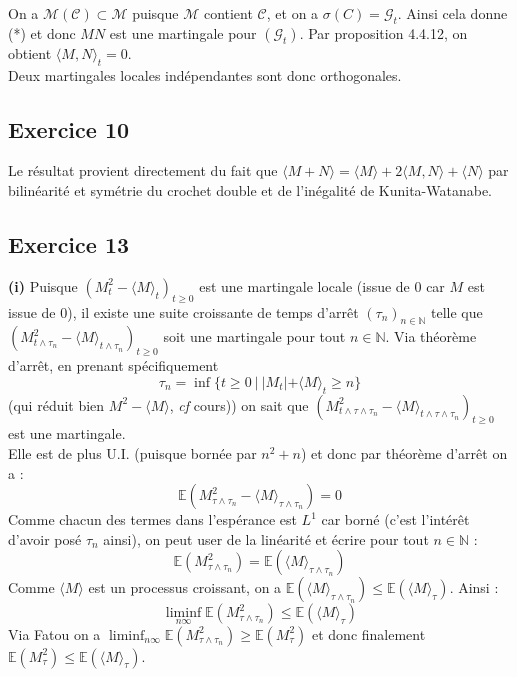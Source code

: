 \documentclass[a4paper,12pt]{article}
\newcommand{\E}{\mathbb{E}}
\newcommand{\n}{\mathbb{N}}
\begin{document}
On a $\mathcal{M} (\mathcal{C}) \subset \mathcal{M}$ puisque $\mathcal{M}$ contient $\mathcal{C}$, et on a $\sigma (C) = \mathcal{G}_t$. Ainsi cela donne (*) et donc $MN$ est une martingale  pour $(\mathcal{G}_t)$. Par proposition 4.4.12, on obtient $\langle M, N \rangle_t = 0$. \\

Deux martingales locales indépendantes sont donc orthogonales.

\subsection{Exercice 10}
Le résultat provient directement du fait que $\langle M+N \rangle = \langle M \rangle + 2 \langle M,N \rangle + \langle N \rangle$ par bilinéarité et symétrie du crochet double et de l'inégalité de Kunita-Watanabe.

\subsection{Exercice 13}
\textbf{(i)} Puisque $(M_t^2- \langle M \rangle_t)_{t \geq 0}$ est une martingale locale (issue de $0$ car $M$ est issue de $0$), il existe une suite croissante de temps d'arrêt $(\tau_n)_{n \in \n}$ telle que $(M_{t \wedge \tau_n}^2- \langle M \rangle_{t \wedge \tau_n})_{t \geq 0}$ soit une martingale pour tout $n \in \n$. Via théorème d'arrêt, en prenant spécifiquement
$$\tau_n = \inf \{t \geq 0 \ | \ |M_t| + \langle M \rangle_t \geq n\}$$
(qui réduit bien $M^2 - \langle M \rangle$, \textit{cf} cours)) on sait que $(M_{t \wedge \tau \wedge \tau_n}^2- \langle M \rangle_{t \wedge \tau \wedge \tau_n})_{t \geq 0}$ est une martingale. \\

Elle est de plus U.I. (puisque bornée par $n^2+n$) et donc par théorème d'arrêt on a :
$$\E (M_{\tau \wedge \tau_n}^2- \langle M \rangle_{\tau \wedge \tau_n} ) =0$$
Comme chacun des termes dans l'espérance est $L^1$ car borné (c'est l'intérêt d'avoir posé $\tau_n$ ainsi), on peut user de la linéarité et écrire pour tout $n \in \n$ : 
$$\E (M_{\tau \wedge \tau_n}^2) =  \E ( \langle M \rangle_{\tau \wedge \tau_n}) $$
Comme $\langle M \rangle$ est un processus croissant, on a $\E ( \langle M \rangle_{\tau \wedge \tau_n}) \leq \E ( \langle M \rangle_{\tau})$. Ainsi :
$$\liminf_{n \infty} \E (M_{\tau \wedge \tau_n}^2) \leq \E ( \langle M \rangle_{\tau})$$
Via Fatou on a $\liminf_{n \infty} \E (M_{\tau \wedge \tau_n}^2) \geq \E (M_{\tau}^2)$ et donc finalement $\E (M_{\tau}^2) \leq \E (\langle M \rangle_{\tau})$. \\
\end{document}
